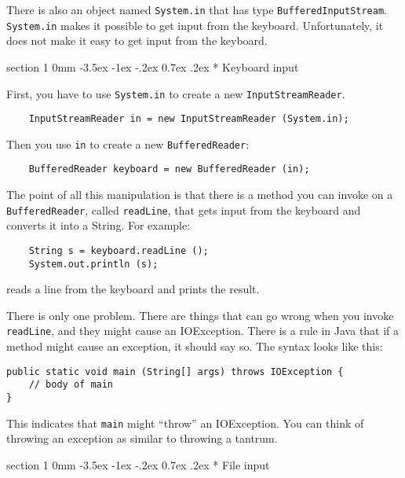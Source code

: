 \documentclass{book}
\makeatletter
\renewcommand{\section}{\@startsection 
    {section} {1} {0mm}%
    {-3.5ex \@plus -1ex \@minus -.2ex}%
    {0.7ex \@plus.2ex}%
    {\normalfont\Large\bfseries}}
\makeatother
\begin{document}
There is also an object named {\tt System.in} that has
type {\tt BufferedInputStream}.  {\tt System.in} makes it
possible to get input from the keyboard.  Unfortunately,
it does not make it easy to get input from the keyboard.


\section* {Keyboard input}
\label{keyboard}

First, you have to use {\tt System.in} to create a new
{\tt InputStreamReader}.

\begin{verbatim}
    InputStreamReader in = new InputStreamReader (System.in);
\end{verbatim}
%
Then you use {\tt in} to create a new {\tt BufferedReader}:

\begin{verbatim}
    BufferedReader keyboard = new BufferedReader (in);
\end{verbatim}
%
The point of all this manipulation is that there is a method
you can invoke on a {\tt BufferedReader}, called {\tt readLine},
that gets input from the keyboard and converts it into a
String.  For example:

\begin{verbatim}
    String s = keyboard.readLine ();
    System.out.println (s);
\end{verbatim}
%
reads a line from the keyboard and prints the result.

There is only one problem.  There are things that can go wrong
when you invoke {\tt readLine}, and they might cause an
IOException.  There is a rule in Java that if a method might
cause an exception, it should say so.  The syntax looks
like this:

\begin {verbatim}
public static void main (String[] args) throws IOException {
    // body of main
}
\end{verbatim}

This indicates that {\tt main} might ``throw'' an IOException.
You can think of throwing an exception as similar to throwing
a tantrum.


\section* {File input}
\label{fileIO}
\end{document}
